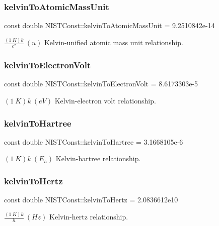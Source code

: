 \subsubsection{\texorpdfstring{kelvin\+To\+Atomic\+Mass\+Unit}{kelvinToAtomicMassUnit}}
{\footnotesize\ttfamily const double N\+I\+S\+T\+Const\+::kelvin\+To\+Atomic\+Mass\+Unit = 9.\+2510842e-\/14}

$\frac{(1\ K)k}{c^2} \ (u)$ Kelvin-\/unified atomic mass unit relationship. \mbox{\label{group___kelvin_gae61d97fa154d94e710c951a26bd47896}} 
\subsubsection{\texorpdfstring{kelvin\+To\+Electron\+Volt}{kelvinToElectronVolt}}
{\footnotesize\ttfamily const double N\+I\+S\+T\+Const\+::kelvin\+To\+Electron\+Volt = 8.\+6173303e-\/5}

$(1\ K)k \ (eV)$ Kelvin-\/electron volt relationship. \mbox{\label{group___kelvin_gaece5622592a7f817204ca28c6d00d570}} 
\subsubsection{\texorpdfstring{kelvin\+To\+Hartree}{kelvinToHartree}}
{\footnotesize\ttfamily const double N\+I\+S\+T\+Const\+::kelvin\+To\+Hartree = 3.\+1668105e-\/6}

$(1\ K)k \ (E_h)$ Kelvin-\/hartree relationship. \mbox{\label{group___kelvin_gaa426666c20c9b04efcdcfd05f5a90cd9}} 
\subsubsection{\texorpdfstring{kelvin\+To\+Hertz}{kelvinToHertz}}
{\footnotesize\ttfamily const double N\+I\+S\+T\+Const\+::kelvin\+To\+Hertz = 2.\+0836612e10}

$\frac{(1\ K)k}{h} \ (Hz)$ Kelvin-\/hertz relationship. \mbox{\label{group___kelvin_ga361938b994609879a0377a94e49dacf2}} 
